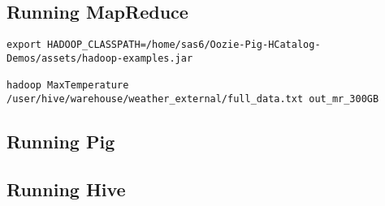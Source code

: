\subsection{Running MapReduce}





\begin{lstlisting}[linewidth=\columnwidth,breaklines=true]
export HADOOP_CLASSPATH=/home/sas6/Oozie-Pig-HCatalog-Demos/assets/hadoop-examples.jar

hadoop MaxTemperature /user/hive/warehouse/weather_external/full_data.txt out_mr_300GB
\end{lstlisting}

\subsection{Running Pig}

\subsection{Running Hive}